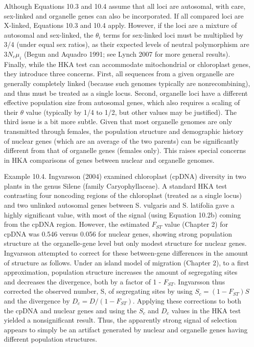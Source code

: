 \documentclass{article}
\begin{document}
Although Equations 10.3 and 10.4 assume that all loci are autosomal, with care, sex-linked and organelle genes can also be incorporated. If all compared loci are X-linked, Equations 10.3 and 10.4 apply. However, if the loci are a mixture of autosomal and sex-linked, the  $ \theta_i $ terms for sex-linked loci must be multiplied by 3/4 (under equal sex ratios), as their expected levels of neutral polymorphism are  $ 3N_e\mu_i $ (Begun and Aquadro 1991; see Lynch 2007 for more general results). Finally, while the HKA test can accommodate mitochondrial or chloroplast genes, they introduce three concerns. First, all sequences from a given organelle are generally completely linked (because such genomes typically are nonrecombining), and thus must be treated as a single locus. Second, organelle loci have a different effective population size from autosomal genes, which also requires a scaling of their  $ \theta $ value (typically by 1/4 to 1/2, but other values may be justified). The third issue is a bit more subtle. Given that most organelle genomes are only transmitted through females, the population structure and demographic history of nuclear genes (which are an average of the two parents) can be significantly different from that of organelle genes (females only). This raises special concerns in HKA comparisons of genes between nuclear and organelle genomes.

Example 10.4. Ingvarsson (2004) examined chloroplast (cpDNA) diversity in two plants in the genus Silene (family Caryophyllaceae). A standard HKA test contrasting four noncoding regions of the chloroplast (treated as a single locus) and two unlinked autosomal genes between S. vulgaris and S. latifolia gave a highly significant value, with most of the signal (using Equation 10.2b) coming from the cpDNA region. However, the estimated  $ F_{ST} $ value (Chapter 2) for cpDNA was 0.546 versus 0.056 for nuclear genes, showing strong population structure at the organelle-gene level but only modest structure for nuclear genes. Ingvarsson attempted to correct for these between-gene differences in the amount of structure as follows. Under an island model of migration (Chapter 2), to a first approximation, population structure increases the amount of segregating sites and decreases the divergence, both by a factor of 1 -  $ F_{ST} $. Ingvarsson thus corrected the observed number, S, of segregating sites by using  $ S_{c} = (1 - F_{ST})S $ and the divergence by  $ D_{c} = D/(1 - F_{ST}) $. Applying these corrections to both the cpDNA and nuclear genes and using the  $ S_{c} $ and  $ D_{c} $ values in the HKA test yielded a nonsignificant result. Thus, the apparently strong signal of selection appears to simply be an artifact generated by nuclear and organelle genes having different population structures.
\end{document}
